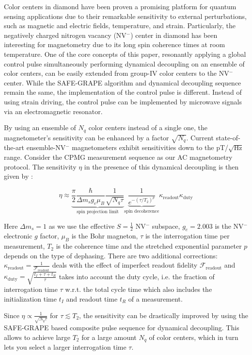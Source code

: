Color centers in diamond have been proven a promising platform for quantum sensing applications due to their remarkable sensitivity to external perturbations, such as magnetic and electric fields, temperature, and strain. Particularly, the negatively charged nitrogen vacancy (NV$^-$) center in diamond has been interesting for magnetometry due to its long spin coherence times at room temperature. One of the core concepts of this paper, resonantly applying a global control pulse simultaneously performing dynamical decoupling on an ensemble of color centers, can be easily extended from group-IV color centers to the NV$^-$ center. While the SAFE-GRAPE algorithm and dynamical decoupling sequence remain the same, the implementation of the control pulse is different. Instead of using strain driving, the control pulse can be implemented by microwave signals via an electromagnetic resonator.

By using an ensemble of $N_q$ color centers instead of a single one, the magnetometer's sensitivity can be enhanced by a factor $\sqrt{N_q}$. Current state-of-the-art ensemble-NV$^-$ magnetometers exhibit sensitivities down to the pT/$\sqrt{\text{Hz}}$ range. Consider the CPMG measurement sequence as our AC magnetometry protocol. The sensitivity $\eta$ in the presence of this dynamical decoupling is then given by \cite{RevModPhys.92.015004}: 

\begin{equation}
    \eta \approx \underbrace{\frac{\pi}{2}\frac{\hbar}{\Delta m_s g_e \mu_B} \frac{1}{\sqrt{N_q \tau}}}_{\text{spin projection limit}} \underbrace{\frac{1}{e^{-(\tau/T_2)^p}}}_{\text{spin decoherence}} \kappa_{\text{readout}} \kappa_{\text{duty}}
\end{equation}

Here $\Delta m_s=1$ as we use the effective $S=\frac{1}{2}$ NV$^-$ subspace, $g_e=2.003$ is the NV$^-$ electronic $g$ factor, $\mu_B$ is the Bohr magneton, $\tau$ is the interrogation time per measurement, $T_2$ is the coherence time and the stretched exponential parameter $p$ depends on the type of dephasing. There are two additional corrections: $\kappa_{\text{readout}}=\frac{1}{\mathcal{F}_{\text{readout}}}$ deals with the effect of imperfect readout fidelity $\mathcal{F}_{\text{readout}}$ and $\kappa_{\text{duty}}=\sqrt{\frac{t_I+\tau+t_R}{\tau}}$ takes into account the duty cycle, i.e. the fraction of interrogation time $\tau$ w.r.t. the total cycle time which also includes the initialization time $t_I$ and readout time $t_R$ of a measurement. 

Since $\eta \propto \frac{1}{\sqrt{N_q \tau}}$ for $\tau \lesssim T_2$, the sensitivity can be drastically improved by using the SAFE-GRAPE based composite pulse sequence for dynamical decoupling. This allows to achieve large $T_2$ for a large amount $N_q$ of color centers, which in turn lets you select a larger interrogation time $\tau$.

\endgroup
